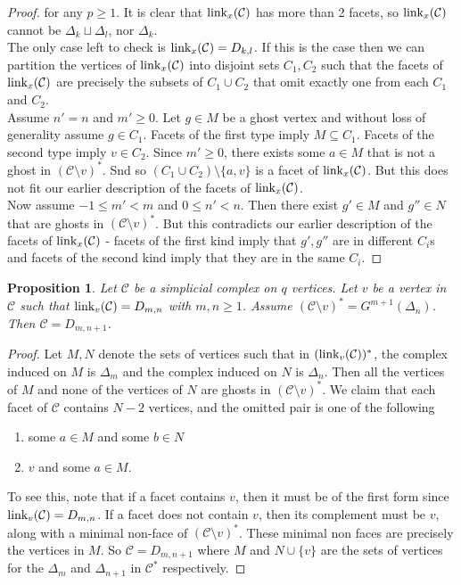 \documentclass[letterpaper,12pt]{amsart}
\theoremstyle{plain}
\newtheorem{prop}[thm]{Proposition}
\theoremstyle{definition}
\theoremstyle{remark}
\newcommand{\calc}{\mathcal{C}}
\newcommand{\link}{\textnormal{link}}
\begin{document}
{\begin{proof}
	for any $p \ge 1$.
	It is clear that $\link_x(\mathcal{C})$ has more than 2 facets, so $\link_x(\mathcal{C})$ cannot be $\Delta_k \sqcup \Delta_l$,
	nor $\Delta_k$.
	\\
	\indent
	The only case left to check is $\link_x(\mathcal{C}) = D_{k,l}$.
	If this is the case then we can partition the vertices of $\link_x(\mathcal{C})$ into disjoint sets $C_1,C_2$ such that
	the facets of $\link_x(\mathcal{C})$ are precisely the subsets of $C_1 \cup C_2$ that omit exactly one from each $C_1$ and $C_2$.
	\\
	\indent
	Assume $n' = n$ and $m' \ge 0$.
	Let $g\in M$ be a ghost vertex and without loss of generality assume $g \in C_1$.
	Facets of the first type imply $M \subseteq C_1$.
	Facets of the second type imply $v \in C_2$.
	Since $m' \ge 0$, there exists some $a \in M$ that is not a ghost in $(\calc\setminus v)^*$.
	Snd so $(C_1\cup C_2)\setminus\{a,v\}$ is a facet of $\link_x(\calc)$.
	But this does not fit our earlier description of the facets of $\link_x(\calc)$.
	\\
	\indent
	Now assume $-1\le m'<m$ and $0 \le n'<n$.
	Then there exist $g' \in M$ and $g'' \in N$ that are ghosts in $(\calc\setminus v)^*$.
	But this contradicts our earlier description of the facets of $\link_x(\calc)$ -
	facets of the first kind imply that $g',g''$ are in different $C_i$s
	and facets of the second kind imply that they are in the same $C_i$.
\end{proof}
}

\begin{prop}\label{n}
	Let $\mathcal{C}$ be a simplicial complex on $q$ vertices.
	Let $v$ be a vertex in $\mathcal{C}$ such that $\link_v(\mathcal{C}) = D_{m,n}$ with $m,n \ge 1$.
	Assume $(\mathcal{C}\setminus v)^* = G^{m+1}(\Delta_{n})$.
	Then $\mathcal{C} = D_{m,n+1}$.
\end{prop}
\begin{proof}
	Let $M,N$ denote the sets of vertices such that
	in $(\link_v(\mathcal{C}))^*$, the complex induced on $M$ is $\Delta_m$
	and the complex induced on $N$ is $\Delta_n$.
	Then all the vertices of $M$ and none of the vertices of $N$ are ghosts in $(\mathcal{C}\setminus v)^*$.
	We claim that each facet of $\mathcal{C}$ contains $N-2$ vertices, and the omitted pair is one of the following
	\begin{enumerate}
		\item some $a \in M$ and some $b \in N$
		\item $v$ and some $a \in M$.
	\end{enumerate}
	To see this, note that if a facet contains $v$, then it must be of the first form since $\link_v(\mathcal{C}) = D_{m,n}$.
	If a facet does not contain $v$, then its complement must be $v$, along with a minimal non-face of $(\mathcal{C}\setminus v)^*$.
	These minimal non faces are precisely the vertices in $M$.
	So $\mathcal{C} = D_{m,n+1}$ where $M$ and $N \cup \{v\}$
	are the sets of vertices for the $\Delta_{m}$ and $\Delta_{n+1}$ in $\mathcal{C}^*$ respectively.
\end{proof}
\end{document}

